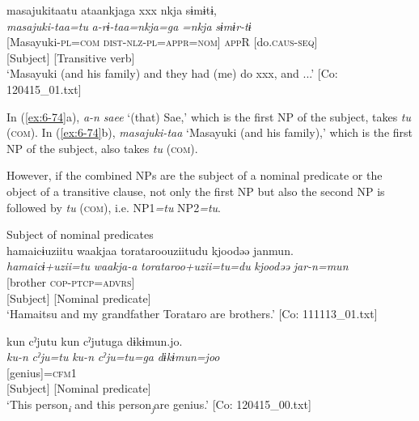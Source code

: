 {\TM}
\gllll masajukitaatu  ataankjaga  xxx  nkja  sɨmɨtɨ,\\
      \textit{masajuki-taa=tu}  \textit{a-rɨ-taa=nkja=ga}    \textit{=nkja}     \textit{sɨmɨr-tɨ}\\
      {}[Masayuki-\textsc{pl}=\textsc{com}  \textsc{dist}-\textsc{nlz}-\textsc{pl}=\textsc{appr}=\textsc{nom}]    \textsc{app}R      [do.\textsc{caus}-\textsc{seq}]\\
      {}[Subject]          [Transitive verb]\\
\glt ‘Masayuki (and his family) and they had (me) do xxx, and ...’ [Co: 120415\_01.txt]
\z

In (\ref{ex:6-74}a), \textit{a-n} \textit{saee} ‘(that) Sae,’ which is the first NP of the subject, takes \textit{tu} (\textsc{com}). In (\ref{ex:6-74}b), \textit{masajuki-taa} ‘Masayuki (and his family),’ which is the first NP of the subject, also takes \textit{tu} (\textsc{com}).

  However, if the combined NPs are the subject of a nominal predicate or the object of a transitive clause, not only the first NP but also the second NP is followed by \textit{tu} (\textsc{com}), i.e. NP1\textit{=tu} NP2\textit{=tu}.

\ea\label{ex:6-75}
 Subject of nominal predicates\\

 \ea {\TM}  hamaicɨuziitu  waakjaa  torataroouziitudu     kjoodəə  janmun.\\
\gllll \textit{hamaicɨ+uzii=tu}  \textit{waakja-a}  \textit{torataroo+uzii=tu=du}    \textit{kjoodəə}  \textit{jar-n=mun}\\
[Hamaitsu+grandfather=\textsc{com}  1\textsc{pl}-\textsc{adnz}  Torataro+grandfather=\textsc{com}=\textsc{foc}]     [brother  \textsc{cop}-\textsc{ptcp}=\textsc{advrs}]\\
      {}[Subject]      [Nominal predicate]\\
\glt ‘Hamaitsu and my grandfather Torataro are brothers.’ [Co: 111113\_01.txt]
\z

\ex {\TM}  kun  cˀjutu  kun  cˀjutuga      dɨkɨmun.jo.\\
\gllll \textit{ku-n}  \textit{cˀju=tu}  \textit{ku-n}  \textit{cˀju=tu=ga}    \textit{dɨkɨmun=joo}\\
[\textsc{prox}-\textsc{adnz}  person=\textsc{com}  \textsc{prox}-\textsc{adnz}  person=\textsc{com}]     [genius]=\textsc{cfm}1\\
      {}[Subject]      [Nominal predicate]\\
\glt ‘This person\textit{\textsubscript{i}} and this person\textit{\textsubscript{j}}are genius.’ [Co: 120415\_00.txt]
\z

